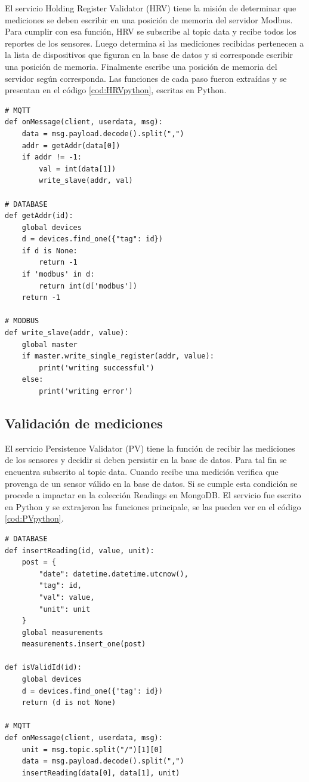 El servicio Holding Register Validator (HRV) tiene la misión de determinar que mediciones se deben escribir en una posición de memoria del servidor Modbus.
Para cumplir con esa función, HRV se subscribe al topic data y recibe todos los reportes de los sensores.
Luego determina si las mediciones recibidas pertenecen a la lista de dispositivos que figuran en la base de datos y si corresponde escribir una posición de memoria.
Finalmente escribe una posición de memoria del servidor según corresponda.
Las funciones de cada paso fueron extraídas y se presentan en el código \ref{cod:HRVpython}, escritas en Python.

\newpage

\begin{lstlisting}[label=cod:HRVpython,caption=Funciones principales del servicio HRV]
# MQTT
def onMessage(client, userdata, msg):
    data = msg.payload.decode().split(",")
    addr = getAddr(data[0])
    if addr != -1:
        val = int(data[1])
        write_slave(addr, val)
        
# DATABASE
def getAddr(id):
    global devices
    d = devices.find_one({"tag": id})
    if d is None:
        return -1
    if 'modbus' in d:
        return int(d['modbus'])
    return -1

# MODBUS
def write_slave(addr, value):
    global master
    if master.write_single_register(addr, value):
        print('writing successful')
    else:
        print('writing error')
\end{lstlisting}

\subsection{Validación de mediciones}

El servicio Persistence Validator (PV) tiene la función de recibir las mediciones de los sensores y decidir si deben persistir en la base de datos.
Para tal fin se encuentra subscrito al topic data.
Cuando recibe una medición verifica que provenga de un sensor válido en la base de datos.
Si se cumple esta condición se procede a impactar en la colección Readings en MongoDB.
El servicio fue escrito en Python y se extrajeron las funciones principale, se las pueden ver en el código \ref{cod:PVpython}.

\begin{lstlisting}[label=cod:PVpython,caption=Funciones principales del servicio PV]
# DATABASE
def insertReading(id, value, unit):
    post = {
        "date": datetime.datetime.utcnow(),
        "tag": id,
        "val": value,
        "unit": unit
    }
    global measurements
    measurements.insert_one(post)

def isValidId(id):
    global devices
    d = devices.find_one({'tag': id})
    return (d is not None)
    
# MQTT
def onMessage(client, userdata, msg):
    unit = msg.topic.split("/")[1][0]
    data = msg.payload.decode().split(",")
    insertReading(data[0], data[1], unit)    
\end{lstlisting}
	
